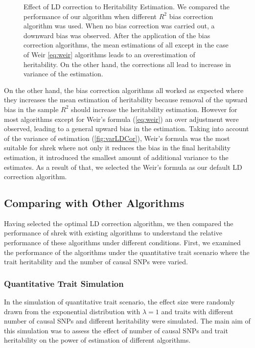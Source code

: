 \begin{figure}
{				\label{fig:varLDCor}
			}
			\caption[Effect of LD correction to Heritability Estimation]
			{Effect of LD correction to Heritability Estimation.
				We compared the performance of our algorithm when different $R^2$ bias correction algorithm was used.
				When no bias correction was carried out, a downward bias was observed. 
				After the application of the bias correction algorithms, the mean estimations of all except in the case of Weir \cref{eq:weir} algorithms leads to an overestimation of heritability.
				On the other hand, the corrections all lead to increase in variance of the estimation.
			} 
			\label{fig:ldCorCom}
		\end{figure}
		On the other hand, the bias correction algorithms all worked as expected where they increases the mean estimation of heritability because removal of the upward bias in the sample $R^2$ should increase the heritability estimation.
		However for most algorithms except for Weir's formula (\cref{eq:weir}) an over adjustment were observed, leading to a general upward bias in the estimation.
		Taking into account of the variance of estimation (\cref{fig:varLDCor}), Weir's formula was the most suitable for \gls{shrek} where not only it reduces the bias in the final heritability estimation, it introduced the smallest amount of additional variance to the estimates.
		As a result of that, we selected the Weir's formula as our default \gls{LD} correction algorithm.
		
		\subsection{Comparing with Other Algorithms}
		Having selected the optimal \gls{LD} correction algorithm, we then compared the performance of \gls{shrek} with existing algorithms to understand the relative performance of these algorithms under different conditions.
		First, we examined the performance of the algorithms under the quantitative trait scenario where the trait heritability and the number of causal \glspl{SNP} were varied.
		
		\subsubsection{Quantitative Trait Simulation}
		 
		In the simulation of quantitative trait scenario, the effect size were randomly drawn from the exponential distribution with $\lambda=1$ and traits with different number of causal \glspl{SNP} and different heritability were simulated.
		The main aim of this simulation was to assess the effect of number of causal \glspl{SNP} and trait heritability on the power of estimation of different algorithms.
		
